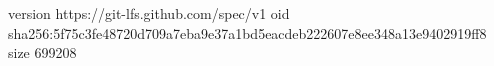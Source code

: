 version https://git-lfs.github.com/spec/v1
oid sha256:5f75c3fe48720d709a7eba9e37a1bd5eacdeb222607e8ee348a13e9402919ff8
size 699208
